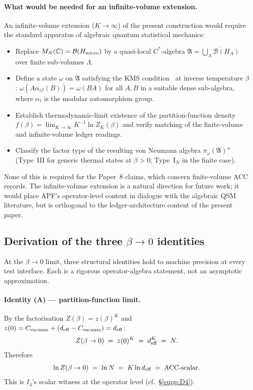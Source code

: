 \documentclass[11pt]{article}
\theoremstyle{plain}
\theoremstyle{definition}
\theoremstyle{remark}
\begin{document}
\paragraph{What would be needed for an infinite-volume extension.}  An infinite-volume extension ($K \to \infty$) of the present construction would require the standard apparatus of algebraic quantum statistical mechanics:
\begin{itemize}[leftmargin=2em,itemsep=2pt]
  \item Replace $M_N(\mathbb{C}) = \mathcal{B}(H_{\rm micro})$ by a quasi-local $C^*$-algebra $\mathfrak{A} = \overline{\bigcup_\Lambda \mathcal{B}(H_\Lambda)}$ over finite sub-volumes $\Lambda$.
  \item Define a state $\omega$ on $\mathfrak{A}$ satisfying the KMS condition~\cite{KuboMartinSchwinger} at inverse temperature $\beta$: $\omega(A \alpha_{i\beta}(B)) = \omega(BA)$ for all $A, B$ in a suitable dense sub-algebra, where $\alpha_t$ is the modular automorphism group.
  \item Establish thermodynamic-limit existence of the partition-function density $f(\beta) = \lim_{K \to \infty} K^{-1} \ln Z_K(\beta)$ and verify matching of the finite-volume and infinite-volume ledger readings.
  \item Classify the factor type of the resulting von Neumann algebra $\pi_\omega(\mathfrak{A})''$ (Type~III for generic thermal states at $\beta > 0$; Type~I$_N$ in the finite case).
\end{itemize}
None of this is required for the Paper~8 claims, which concern finite-volume ACC records.  The infinite-volume extension is a natural direction for future work; it would place APF's operator-level content in dialogue with the algebraic QSM literature, but is orthogonal to the ledger-architecture content of the present paper.

\bigskip

\subsection{Derivation of the three \texorpdfstring{$\beta \to 0$}{beta-to-zero} identities}\label{supp:H2}

At the $\beta \to 0$ limit, three structural identities hold to machine precision at every test interface.  Each is a rigorous operator-algebra statement, not an asymptotic approximation.

\paragraph{Identity (A) --- partition-function limit.}  By the factorisation $Z(\beta) = z(\beta)^K$ and $z(0) = C_{\rm vacuum} + (d_{\rm eff} - C_{\rm vacuum}) = d_{\rm eff}$:
\[
  Z(\beta \to 0) \;=\; z(0)^K \;=\; d_{\rm eff}^K \;=\; N.
\]
Therefore
\[
  \ln Z(\beta \to 0) \;=\; \ln N \;=\; K \ln d_{\rm eff} \;=\; \mathrm{ACC}\text{-scalar}.
\]
This is $I_4$'s scalar witness at the operator level (cf.\ \S\ref{supp:D4}).
\end{document}
